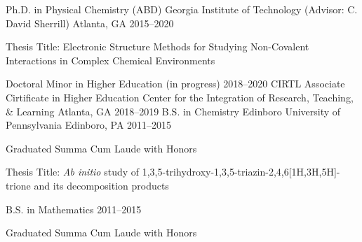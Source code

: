 

\begin{cventries}

  \cventry
    {Ph.D. in Physical Chemistry (ABD)} %
    {Georgia Institute of Technology (Advisor: C. David Sherrill)} %
    {Atlanta, GA} %
    {2015--2020} %
    {
      \begin{cvitems}
        \item[] Thesis Title: Electronic Structure Methods for Studying Non-Covalent Interactions in Complex Chemical Environments
      \end{cvitems}
    }
\cventry
    {Doctoral Minor in Higher Education (in progress)} %
    {} %
    {} %
    {2018--2020} %
    {
    }
  \cventry
    {CIRTL Associate Cirtificate in Higher Education} %
    {Center for the Integration of Research, Teaching, \& Learning} %
    {Atlanta, GA} %
    {2018--2019} %
    {
    }
  \cventry
    {B.S. in Chemistry} %
    {Edinboro University of Pennsylvania} %
    {Edinboro, PA} %
    {2011--2015} %
    {
      \begin{cvitems}
        \item[] Graduated Summa Cum Laude with Honors
        \item[] Thesis Title: {\em Ab initio} study of 1,3,5-trihydroxy-1,3,5-triazin-2,4,6[1H,3H,5H]-trione and its decomposition products
      \end{cvitems}
    }
  \cventry
    {B.S. in Mathematics} %
    {} %
    {} %
    {2011--2015} %
    {
      \begin{cvitems} %
        \item[] Graduated Summa Cum Laude with Honors
      \end{cvitems}
    }
\end{cventries}

